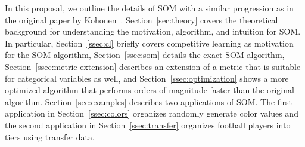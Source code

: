 In this proposal, we outline the details of SOM
with a similar progression as in the original paper by Kohonen~\cite{kohonen:1990}.
Section~\ref{sec:theory} covers the theoretical background for understanding 
the motivation, algorithm, and intuition for SOM.
In particular, Section~\ref{ssec:cl} briefly covers competitive learning
as motivation for the SOM algorithm,
Section~\ref{ssec:som} details the exact SOM algorithm,
Section~\ref{ssec:metric-extension} describes an extension
of a metric that is suitable for categorical variables as well,
and Section~\ref{ssec:optimization} shows a more optimized algorithm
that performs orders of magnitude faster than the original algorithm.
Section~\ref{sec:examples} describes two applications of SOM.
The first application in Section~\ref{ssec:colors} organizes randomly generate color values
and the second application in Section~\ref{ssec:transfer}
organizes football players into tiers using transfer data.
